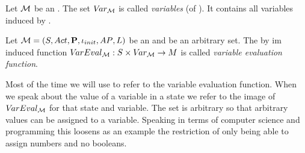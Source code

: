\documentclass[preview]{standalone}
\begin{document}
%
%
%

\begin{definition}
	Let ${{\mathcal{M}}}$ be an \mdpN. The set ${V\!ar_{{{\mathcal{M}}}}}$ is called \emph{variables} (of \mdp). It contains all variables induced by \mdp.
\end{definition}

\begin{definition}
	Let ${{\mathcal{M}}} = {({S}, {Act}, {\textbf{P}}, {\iota_{init}}, {AP}, {L})}$ be an \mdpN and \varevalimgset be an arbitrary set. The by im induced function ${V\!arEval_{{{\mathcal{M}}}}} : {S} \times {V\!ar_{\ensuremath{{{\mathcal{M}}}}}} \to {\ensuremath{{M}}}$ is called \emph{variable evaluation function}.
\end{definition} 

Most of the time we will use \vareval to refer to the variable evaluation function. When we speak about the value of a variable in a state we refer to the image of ${V\!arEval_{{{\mathcal{M}}}}}$ for that state and variable. The set \varevalimgset is arbitrary so that arbitrary values can be assigned to a variable. Speaking in terms of computer science and programming this loosens as an example the restriction of only being able to assign numbers and no booleans.
\end{document}
